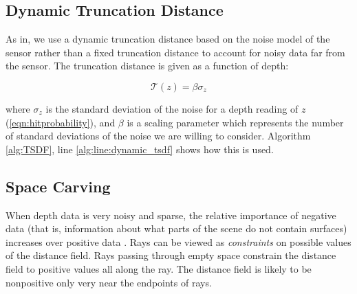 \documentclass[conference]{IEEEtran}
\newcommand{\eref}[1]{(\ref{#1})}
\begin{document}

\subsection{Dynamic Truncation Distance}
\label{section:dynamic_trunc}
As in\cite{Nguyen2012, NiessnerHashing}, we use a dynamic truncation distance based on the
noise model of the sensor rather than a fixed truncation distance to account for
noisy data far from the sensor. The truncation distance is given as a function
of depth:

\begin{equation} \mathcal{T} (z) = \beta\sigma_{z} \end{equation}

\noindent where $\sigma_{z}$ is the standard deviation of the noise for a depth
reading of $z$ \eref{eqn:hitprobability}, and $\beta$ is a scaling
parameter which represents the number of standard deviations of the noise we
are willing to consider. Algorithm \ref{alg:TSDF}, line
\ref{alg:line:dynamic_tsdf} shows how this is used.
% 

\subsection{Space Carving}
\label{section:carving}
When depth data is very noisy and sparse, the relative importance of negative
data (that is, information about what parts of the scene do not contain
surfaces) increases over positive data \cite{Elfes1989, Klingensmith2014}. Rays
can be viewed as \textit{constraints} on possible values of the distance field.  Rays
passing through empty space constrain the distance field to positive values all
along the ray. The distance field is likely to be nonpositive only very near the
endpoints of rays.
\end{document}
